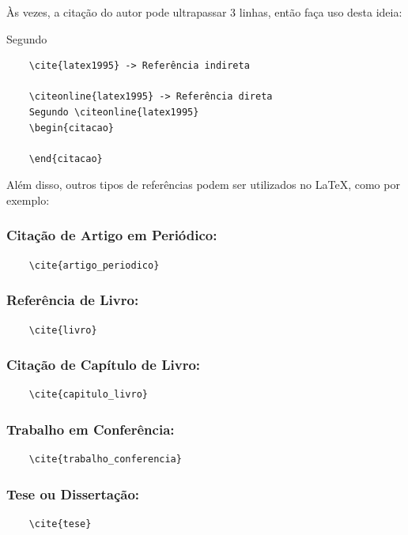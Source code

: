 Às vezes, a citação do autor pode ultrapassar 3 linhas, então faça uso desta ideia:
\begin{citacao}
    Segundo 
    \lipsum[59]
\end{citacao}

\begin{verbatim}
    \cite{latex1995} -> Referência indireta
    
    \citeonline{latex1995} -> Referência direta            
    Segundo \citeonline{latex1995}
    \begin{citacao}
        
    \end{citacao}
\end{verbatim}

Além disso, outros tipos de referências podem ser utilizados no LaTeX, como por exemplo:

\subsubsection{Citação de Artigo em Periódico:}
\begin{verbatim}
    \cite{artigo_periodico}
\end{verbatim}
\cite{artigo_periodico}

\subsubsection{Referência de Livro:}
\begin{verbatim}
    \cite{livro}
\end{verbatim}
\cite{livro}

\subsubsection{Citação de Capítulo de Livro:}
\begin{verbatim}
    \cite{capitulo_livro}
\end{verbatim}
\cite{capitulo_livro}

\subsubsection{Trabalho em Conferência:}
\begin{verbatim}
    \cite{trabalho_conferencia}
\end{verbatim}
\cite{trabalho_conferencia}

\subsubsection{Tese ou Dissertação:}
\begin{verbatim}
    \cite{tese}
\end{verbatim}
\cite{tese}

